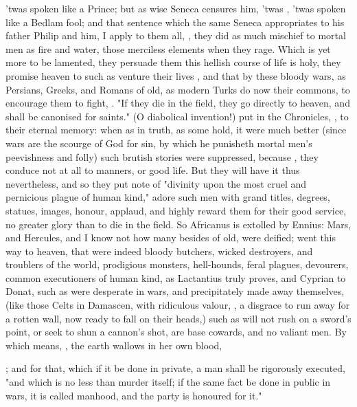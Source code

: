 'twas spoken like a Prince; but as wise Seneca censures
him, 'twas , 'twas spoken like a Bedlam fool;
and that sentence which the same Seneca appropriates to his
father Philip and him, I apply to them all, , \etc{} they did as much
mischief to mortal men as fire and water, those merciless elements when they
rage. Which is yet more to be lamented, they persuade them
this hellish course of life is holy, they promise heaven to such as venture
their lives , and that by these bloody wars, as Persians,
Greeks, and Romans of old, as modern Turks do now their commons, to encourage
them to fight, . "If they die in the field, they go
directly to heaven, and shall be canonised for saints." (O diabolical
invention!) put in the Chronicles, , to their
eternal memory: when as in truth, as some hold, it were
much better (since wars are the scourge of God for sin, by which he punisheth
mortal men's peevishness and folly) such brutish stories were suppressed,
because , they conduce not at all to
manners, or good life. But they will have it thus nevertheless, and so they put
note of "divinity upon the most cruel and pernicious plague
of human kind," adore such men with grand titles, degrees, statues, images,
honour, applaud, and highly reward them for their good
service, no greater glory than to die in the field. So Africanus is extolled by
Ennius: Mars, and Hercules, and I know not how many besides
of old, were deified; went this way to heaven, that were indeed bloody
butchers, wicked destroyers, and troublers of the world, prodigious monsters,
hell-hounds, feral plagues, devourers, common executioners of human kind, as
Lactantius truly proves, and Cyprian to Donat, such as were desperate in wars,
and precipitately made away themselves, (like those Celts in Damascen, with
ridiculous valour, , a
disgrace to run away for a rotten wall, now ready to fall on their heads,) such
as will not rush on a sword's point, or seek to shun a cannon's shot, are base
cowards, and no valiant men. By which means, ,
the earth wallows in her own blood,

; and for
that, which if it be done in private, a man shall be rigorously executed,
"and which is no less than murder itself; if the same fact
be done in public in wars, it is called manhood, and the party is honoured for
it."

